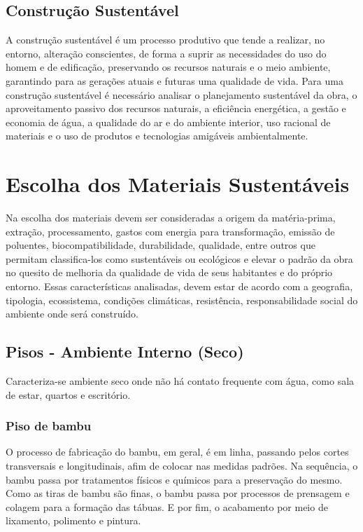\subsection{Construção Sustentável}
	
	A construção sustentável é um processo produtivo que tende a realizar, no entorno, alteração conscientes, de forma a suprir as necessidades do uso do homem e de edificação, preservando os recursos naturais e o meio ambiente, garantindo para as gerações atuais e futuras uma qualidade de vida\cite{1992Baroni}. Para uma construção sustentável é necessário analisar o planejamento sustentável da obra, o aproveitamento passivo dos recursos naturais, a eficiência energética, a gestão e economia de água, a qualidade do ar e do ambiente interior, uso racional de materiais e o uso de produtos e tecnologias amigáveis ambientalmente\cite{2012Araujo}.


\section{Escolha dos Materiais Sustentáveis}

	Na escolha dos materiais devem ser consideradas a origem da matéria-prima, extração, processamento, gastos com energia para transformação, emissão de poluentes, biocompatibilidade, durabilidade, qualidade, entre outros que permitam classifica-los como sustentáveis ou ecológicos e elevar o padrão da obra no quesito de melhoria da qualidade de vida de seus habitantes e do próprio entorno. Essas características analisadas, devem estar de acordo com a geografia, tipologia, ecossistema, condições climáticas, resistência, responsabilidade social do ambiente onde será construído.

\subsection{Pisos - Ambiente Interno (Seco)}
	
	Caracteriza-se ambiente seco onde não há contato frequente com água, como sala de estar, quartos e escritório.

\subsubsection*{\textbf{Piso de bambu}}

	O processo de fabricação do bambu, em geral, é em linha, passando pelos cortes transversais e longitudinais, afim de colocar nas medidas padrões. Na sequência, o bambu passa por tratamentos físicos e químicos para a preservação do mesmo. Como as tiras de bambu são finas, o bambu passa por processos de prensagem e colagem para a formação das tábuas. E por fim, o acabamento por meio de lixamento, polimento e pintura.\cite{pisoBambu}

